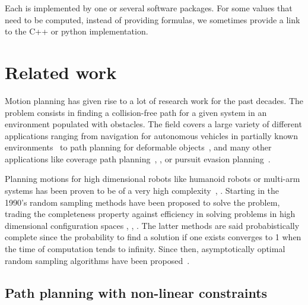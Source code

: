 Each \partie is implemented by one or several software packages. For some values that need to be computed, instead of providing formulas, we sometimes provide a link to the C++ or python implementation.

\section{Related work}\label{sec:related-work}

Motion planning has given rise to a lot of research work for the past decades.
The problem consists in finding a collision-free path for a given system in
an environment populated with obstacles. The field covers a large variety of
different applications ranging from navigation for autonomous vehicles in
partially known environments~\cite{DarpaUrbanChallenge} to path planning for
deformable objects~\cite{LamKav2001}, \cite{RouFerTai2020} and many other applications like coverage path planning~\cite{coverage2001}, \cite{coverage2013}, or pursuit evasion planning~\cite{pursuit-evasion1999}.

Planning motions for high dimensional robots like humanoid robots or multi-arm
systems has been proven to be of a very high complexity~\cite{SchSha1983}, \cite{Canny1983}. Starting in the 1990's random sampling methods have been proposed
to solve the problem, trading the completeness property against efficiency in
solving problems in high dimensional configuration spaces \cite{KSLO1996}, \cite{HsuLatMot99}, \cite{KufLav00}. The latter methods are said probabistically complete since the probability to find a solution if one exists converges to 1 when the time of computation tends to infinity. Since then, asymptotically optimal random sampling algorithms have
been proposed~\cite{KarFra2011}.

\subsection{Path planning with non-linear constraints}

